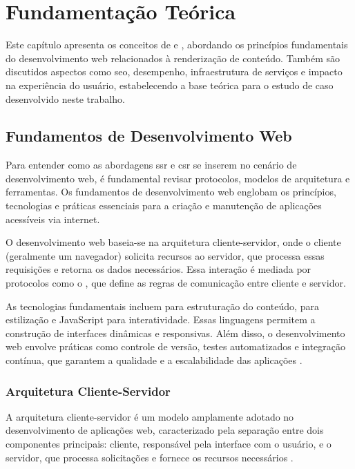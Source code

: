 \chapter{Fundamentação Teórica}
\label{cap:fundamentacao}

Este capítulo apresenta os conceitos de  e , abordando os princípios fundamentais do desenvolvimento web relacionados à renderização de conteúdo. Também são discutidos aspectos como \acrshort{seo}, desempenho, infraestrutura de serviços e impacto na experiência do usuário, estabelecendo a base teórica para o estudo de caso desenvolvido neste trabalho.

\section{Fundamentos de Desenvolvimento Web}
\label{sec:fundamentos-devweb}
Para entender como as abordagens \acrshort{ssr} e \acrshort{csr} se inserem no cenário de desenvolvimento web, é fundamental revisar protocolos, modelos de arquitetura e ferramentas.
Os fundamentos de desenvolvimento web englobam os princípios, tecnologias e práticas essenciais para a criação e manutenção de aplicações acessíveis via internet. 

O desenvolvimento web baseia-se na arquitetura cliente-servidor, onde o cliente (geralmente um navegador) solicita recursos ao servidor, que processa essas requisições e retorna os dados necessários. Essa interação é mediada por protocolos como o 
 , que define as regras de comunicação entre cliente e servidor.

As tecnologias fundamentais incluem  para estruturação do conteúdo,  para estilização e JavaScript para interatividade. Essas linguagens permitem a construção de interfaces dinâmicas e responsivas. Além disso, o desenvolvimento web envolve práticas como controle de versão, testes automatizados e integração contínua, que garantem a qualidade e a escalabilidade das aplicações \cite{fundamentosDevWeb}. 

\subsection{Arquitetura Cliente-Servidor}
\label{subsec:Arquitetura Cliente-Servidor}

A arquitetura cliente-servidor é um modelo amplamente adotado no desenvolvimento de aplicações web, caracterizado pela separação entre dois componentes principais: cliente, responsável pela interface com o usuário, e o servidor, que processa solicitações e fornece os recursos necessários \cite{clienteServidorControlNet}.

